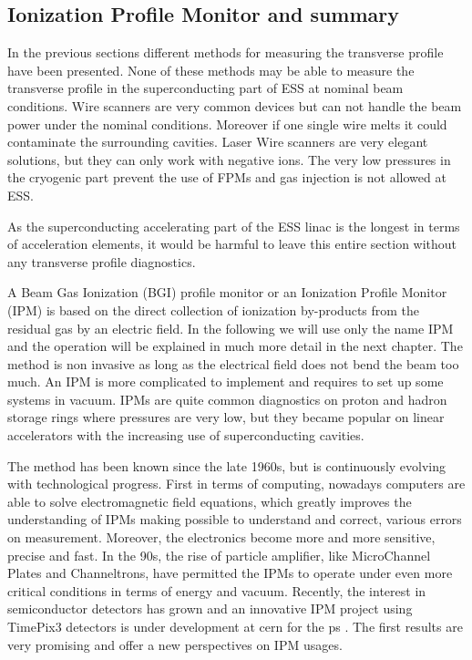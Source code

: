 \begin{refsection}
  \section{Ionization Profile Monitor and summary}
  In the previous sections different methods for measuring the transverse profile have been presented. None of these methods may be able to measure the transverse profile in the superconducting part of ESS at nominal beam conditions. Wire scanners are very common devices but can not handle the beam power under the nominal conditions. Moreover if one single wire melts it could contaminate the surrounding cavities. Laser Wire scanners are very elegant solutions, but they can only work with negative ions. The very low pressures in the cryogenic part prevent the use of FPMs and gas injection is not allowed at ESS.

  As the superconducting accelerating part of the ESS linac is the longest in terms of acceleration elements, it would be harmful to leave this entire section without any transverse profile diagnostics.

  A Beam Gas Ionization (BGI) profile monitor or an Ionization Profile Monitor (IPM) is based on the direct collection of ionization by-products from the residual gas by an electric field. In the following we will use only the name IPM and the operation will be explained in much more detail in the next chapter. The method is non invasive as long as the electrical field does not bend the beam too much. An IPM is more complicated to implement and requires to set up some systems in vacuum. IPMs are quite common diagnostics on proton and hadron storage rings where pressures are very low, but they became popular on linear accelerators with the increasing use of superconducting cavities.

  The method has been known since the late 1960s, but is continuously evolving with technological progress. First in terms of computing, nowadays computers are able to solve electromagnetic field equations, which greatly improves the understanding of IPMs making possible to understand and correct, various errors on measurement. Moreover, the electronics become more and more sensitive, precise and fast. In the 90s, the rise of particle amplifier, like MicroChannel Plates and Channeltrons, have permitted the IPMs to operate under even more critical conditions in terms of energy and vacuum.
  Recently, the interest in semiconductor detectors has grown and an innovative IPM project using TimePix3 detectors is under development at \acrshort{cern} for the \acrshort{ps} \cite{Storey2015}. The first results are very promising \cite{Storey2017} and offer a new perspectives on IPM usages.


\end{refsection}

